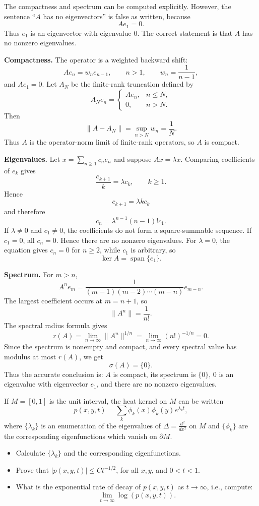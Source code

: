 \begin{solution}
The compactness and spectrum can be computed explicitly. However, the sentence ``$A$ has no eigenvectors'' is false as written, because
\[
Ae_1=0.
\]
Thus $e_1$ is an eigenvector with eigenvalue $0$. The correct statement is that $A$ has no nonzero eigenvalues.

\textbf{Compactness.}
The operator is a weighted backward shift:
\[
Ae_n=w_n e_{n-1},\qquad n>1,\qquad w_n=\frac{1}{n-1},
\]
and $Ae_1=0$. Let $A_N$ be the finite-rank truncation defined by
\[
A_Ne_n=
\begin{cases}
Ae_n,& n\leq N,\\
0,& n>N.
\end{cases}
\]
Then
\[
\|A-A_N\|=\sup_{n>N} w_n=\frac{1}{N}.
\]
Thus $A$ is the operator-norm limit of finite-rank operators, so $A$ is compact.

\textbf{Eigenvalues.}
Let $x=\sum_{n\geq1}c_ne_n$ and suppose $Ax=\lambda x$. Comparing coefficients of $e_k$ gives
\[
\frac{c_{k+1}}{k}=\lambda c_k,\qquad k\geq1.
\]
Hence
\[
c_{k+1}=\lambda k c_k
\]
and therefore
\[
c_n=\lambda^{n-1}(n-1)!c_1.
\]
If $\lambda\neq0$ and $c_1\neq0$, the coefficients do not form a square-summable sequence. If $c_1=0$, all $c_n=0$. Hence there are no nonzero eigenvalues. For $\lambda=0$, the equation gives $c_n=0$ for $n\geq2$, while $c_1$ is arbitrary, so
\[
\ker A=\operatorname{span}\{e_1\}.
\]

\textbf{Spectrum.}
For $m>n$,
\[
A^n e_m=
\frac{1}{(m-1)(m-2)\cdots(m-n)}e_{m-n}.
\]
The largest coefficient occurs at $m=n+1$, so
\[
\|A^n\|=\frac{1}{n!}.
\]
The spectral radius formula gives
\[
r(A)=\lim_{n\to\infty}\|A^n\|^{1/n}
=\lim_{n\to\infty}(n!)^{-1/n}=0.
\]
Since the spectrum is nonempty and compact, and every spectral value has modulus at most $r(A)$, we get
\[
\sigma(A)=\{0\}.
\]
Thus the accurate conclusion is: $A$ is compact, its spectrum is $\{0\}$, $0$ is an eigenvalue with eigenvector $e_1$, and there are no nonzero eigenvalues.
\end{solution}

\begin{exercise}
\label{analysis:2016:12}
If $M = [0, 1]$ is the unit interval, the heat kernel on $M$ can be written
\[
p(x, y, t) = \sum_k \phi_k(x) \phi_k(y) e^{\lambda_k t},
\]
where $\{\lambda_k\}$ is an enumeration of the eigenvalues of $\Delta = \frac{d^2}{dx^2}$ on $M$ and $\{\phi_k\}$ are the corresponding eigenfunctions which vanish on $\partial M$.
\begin{itemize}
    \item[i)] Calculate $\{\lambda_k\}$ and the corresponding eigenfunctions.
    \item[ii)] Prove that $|p(x, y, t)| \leq C t^{-1/2}$, for all $x, y$, and $0 < t < 1$.
    \item[iii)] What is the exponential rate of decay of $p(x, y, t)$ as $t \to \infty$, i.e., compute:
    \[
    \lim_{t \to \infty} \log(p(x, y, t)).
    \]
\end{itemize}
\end{exercise}

